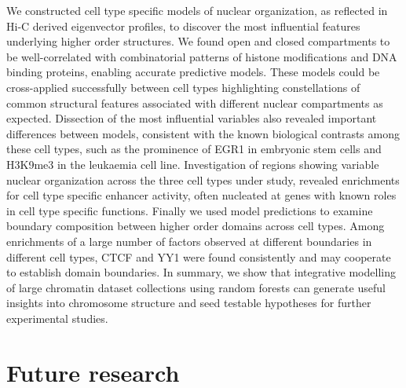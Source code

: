 \documentclass[a4paper,11pt,oneside]{book}
\begin{document}
We constructed cell type specific models of nuclear
organization, as reflected in Hi-C derived eigenvector profiles, to
discover the most influential features underlying higher order
structures. We found open and closed compartments to be
well-correlated with combinatorial patterns of histone modifications
and DNA binding proteins, enabling accurate predictive models. These
models could be cross-applied successfully between cell types
highlighting constellations of common structural features associated
with different nuclear compartments as expected. Dissection of the
most influential variables also revealed important differences between
models, consistent with the known biological contrasts among these
cell types, such as the prominence of EGR1 in embryonic stem cells and
H3K9me3 in the leukaemia cell line. Investigation of regions showing
variable nuclear organization across the three cell types under study,
revealed enrichments for cell type specific enhancer activity, often
nucleated at genes with known roles in cell type specific
functions. Finally we used model predictions to examine boundary
composition between higher order domains across cell types. Among
enrichments of a large number of factors observed at different
boundaries in different cell types, CTCF and YY1 were found
consistently and may cooperate to establish domain boundaries. In
summary, we show that integrative modelling of large chromatin dataset
collections using random forests can generate useful insights into
chromosome structure and seed testable hypotheses for further
experimental studies.

\section{Future research}

\ifstandalone
\begin{small}

\end{small}
\fi
\end{document}
